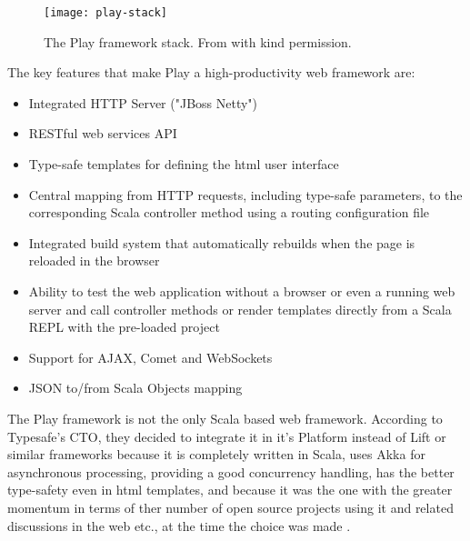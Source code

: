 \begin{figure}[H]
\centering
\texttt{[image: play-stack]}
\caption{The Play framework stack. From \cite{play-book} with kind permission.}
\end{figure}

The key features that make Play a high-productivity web framework are:
 
\begin{itemize}
\item Integrated HTTP Server ("JBoss Netty")
\item RESTful web services API 
\item Type-safe templates for defining the html user interface
\item Central mapping from HTTP requests, including type-safe parameters, to the corresponding Scala controller method using a routing configuration file
\item Integrated build system that automatically rebuilds when the page is reloaded in the browser
\item Ability to test the web application without a browser or even a running web server and call controller methods or render templates directly from a Scala REPL with the pre-loaded project 
\item Support for AJAX, Comet and WebSockets
\item JSON to/from Scala Objects mapping
\end{itemize}

The Play framework is not the only Scala based web framework. According to Typesafe's CTO, they decided to integrate it in it's Platform instead of Lift or similar frameworks because it is completely written in Scala, uses Akka for asynchronous processing, providing a good concurrency handling, has the better type-safety even in html templates, and because it was the one with the greater momentum in terms of ther number of open source projects using it and related discussions in the web etc., at the time the choice was made \cite[cf.][]{playdecision}.
